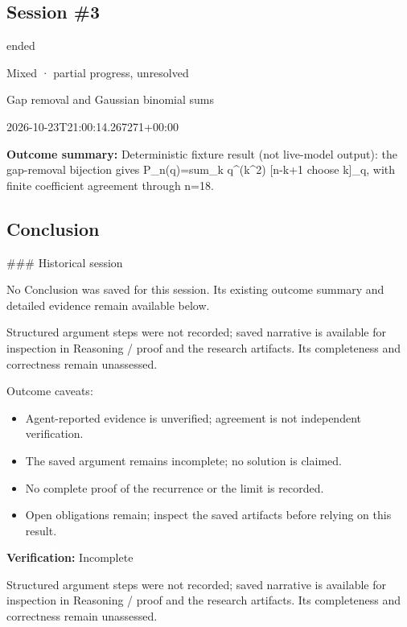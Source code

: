 \documentclass[11pt]{article}
\begin{document}
\subsection{Session \#3}
\begin{description}[style=nextline,font=\normalfont\bfseries,leftmargin=0pt,labelsep=0pt]
\item[Execution status] ended
\item[Outcome] Mixed · partial progress, unresolved
\item[Strategy] Gap removal and Gaussian binomial sums
\item[Started] 2026-10-23T21:00:14.267271+00:00
\end{description}
\textbf{Outcome summary:} Deterministic fixture result (not live-model output): the gap-removal bijection gives P\_n(q)=sum\_k q\textasciicircum{}(k\textasciicircum{}2) [n-k+1 choose k]\_q, with finite coefficient agreement through n=18.\par
\subsection{Conclusion}
\#\#\# Historical session

No Conclusion was saved for this session. Its existing outcome summary and detailed evidence remain available below.

Structured argument steps were not recorded; saved narrative is available for inspection in Reasoning / proof and the research artifacts. Its completeness and correctness remain unassessed.\par
Outcome caveats:\par
\begin{itemize}
\item Agent-reported evidence is unverified; agreement is not independent verification.
\item The saved argument remains incomplete; no solution is claimed.
\item No complete proof of the recurrence or the limit is recorded.
\item Open obligations remain; inspect the saved artifacts before relying on this result.
\end{itemize}
\textbf{Verification:} Incomplete\par
Structured argument steps were not recorded; saved narrative is available for inspection in Reasoning / proof and the research artifacts. Its completeness and correctness remain unassessed.\par
\end{document}
